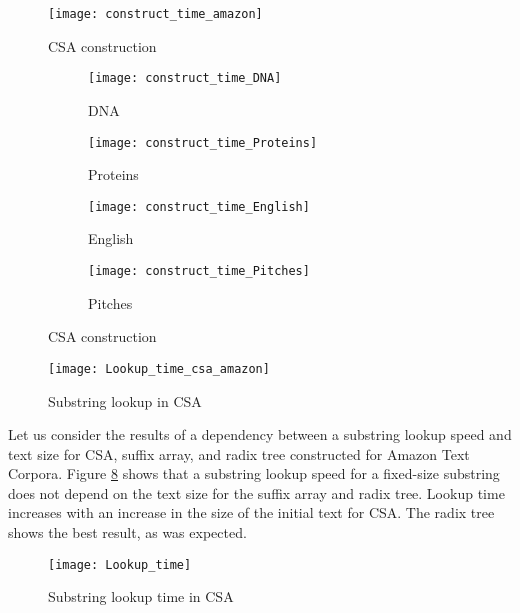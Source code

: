 \begin{figure}[ht!]
	\centering
	\texttt{[image: construct\_time\_amazon]}
	\caption{CSA construction}
	\label{fig:CSA_construct_time_amazon}
\end{figure}

\begin{figure}[ht!]
	\centering
	\begin{subfigure}[b]{0.49\textwidth}
		\centering
		\texttt{[image: construct\_time\_DNA]}
		\caption{DNA}
		\label{fig:y equals x}
	\end{subfigure}
	\hfill
	\begin{subfigure}[b]{0.49\textwidth}
		\centering
		\texttt{[image: construct\_time\_Proteins]}
		\caption{Proteins}
		\label{fig:three sin x proteins}
	\end{subfigure}
	\hfill
	\begin{subfigure}[b]{0.49\textwidth}
		\centering
		\texttt{[image: construct\_time\_English]}
		\caption{English}
		\label{fig:three sin x english}
	\end{subfigure}
	\hfill
	\begin{subfigure}[b]{0.49\textwidth}
		\centering
		\texttt{[image: construct\_time\_Pitches]}
		\caption{Pitches}
		\label{fig:three sin x pitches}
	\end{subfigure}
	\caption{CSA construction}
	\label{fig:three graphs}
\end{figure}

\begin{figure}[ht!]
	\centering
	\texttt{[image: Lookup\_time\_csa\_amazon]}
	\caption{Substring lookup in CSA}
	\label{fig:CSA_Lookup_time_csa_amazon}
\end{figure}

\clearpage
\newpage

Let us consider the results of a dependency between a substring lookup speed and text size for CSA,
suffix array, and radix tree constructed for Amazon Text Corpora. Figure \ref{fig:CSA_Lookup_time}
shows that a substring lookup speed for a fixed-size substring does not depend on the text size for
the suffix array and radix tree. Lookup time increases with an increase in the size of the initial text for CSA.
The radix tree shows the best result, as was expected.

\begin{figure}[ht!]
	\centering
	\texttt{[image: Lookup\_time]}
	\caption{Substring lookup time in CSA}
	\label{fig:CSA_Lookup_time}
\end{figure}
